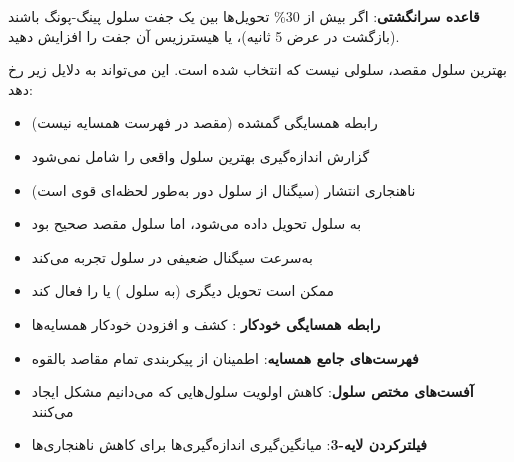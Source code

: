 \textbf{قاعده سرانگشتی}: اگر بیش از 30\% تحویل‌ها بین یک جفت سلول پینگ-پونگ باشند (بازگشت در عرض 5 ثانیه)،  یا هیسترزیس آن جفت را افزایش دهید.



\CNchained{}

بهترین سلول مقصد، سلولی نیست که انتخاب شده است. این می‌تواند به دلایل زیر رخ دهد:

\begin{itemize}
\tightlist
\item
  رابطه همسایگی گمشده (مقصد در فهرست همسایه نیست)
\item
  گزارش اندازه‌گیری بهترین سلول واقعی را شامل نمی‌شود
\item
  ناهنجاری انتشار (سیگنال از سلول دور به‌طور لحظه‌ای قوی است)
\end{itemize}


\begin{itemize}
\tightlist
\item
   به سلول  تحویل داده می‌شود، اما سلول  مقصد صحیح بود
\item
   به‌سرعت سیگنال ضعیفی در سلول  تجربه می‌کند
\item
  ممکن است تحویل دیگری (به سلول ) یا  را فعال کند
\end{itemize}


\begin{itemize}
\tightlist
\item
  \textbf{رابطه همسایگی خودکار }: کشف و افزودن خودکار همسایه‌ها
\item
  \textbf{فهرست‌های جامع همسایه}: اطمینان از پیکربندی تمام مقاصد بالقوه
\item
  \textbf{آفست‌های مختص سلول}: کاهش اولویت سلول‌هایی که می‌دانیم مشکل ایجاد می‌کنند
\item
  \textbf{فیلترکردن لایه-3}: میانگین‌گیری اندازه‌گیری‌ها برای کاهش ناهنجاری‌ها
\end{itemize}





